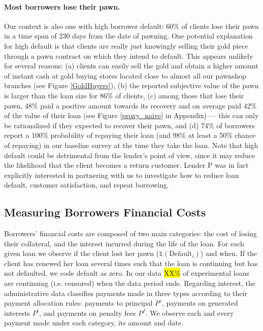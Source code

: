 \documentclass[oneside,11pt]{article}
\begin{document}
\paragraph{Most borrowers lose their pawn.} Our context is also one with high borrower default: 60\% of clients lose their pawn in a time span of 230 days from the date of pawning. One potential explanation for high default is that clients are really just knowingly selling their gold piece through a pawn contract on which they intend to default. This appears unlikely for several reasons: (a) clients can easily sell the gold and obtain a higher amount of instant cash at gold buying stores located close to almost all our pawnshop branches (see Figure \ref{GoldBuyers}), (b) the reported subjective value of the pawn is larger than the loan size for 86\% of clients, (c) among those that lose their pawn, 48\% paid a positive amount towards its recovery and on average paid 42\% of the value of their loan (see Figure \ref{proxy_naive} in Appendix) --- this can only be rationalized if they expected to recover their pawn, and (d) 74\% of borrowers report a 100\% probability of repaying their loan (and 98\% at least a 50\% chance of repaying) in our baseline survey at the time they take the loan.  Note that high default could be detrimental from the lender's point of view, since it may reduce the likelihood that the client becomes a return customer. Lender P was in fact explicitly interested in partnering with us to investigate how to reduce loan default, customer satisfaction, and repeat borrowing.

    
\subsection{Measuring Borrowers Financial Costs} \label{costs}
    
Borrowers' financial costs are composed of two main categories: the cost of losing their collateral, and the interest incurred during the life of the loan. For each given loan we observe if the client lost her pawn ($\mathds{1}(\text{Default}_i)$) and when. If the client has renewed her loan several times such that the loan is continuing but has not defaulted, we code default as zero. In our data \hl{XX\%} of experimental loans are continuing (i.e. censored) when the data period ends. Regarding interest, the administrative data classifies payments made in three types according to their payment allocation rules: payments to principal $P^c$, payments on generated interests $P^i$, and payments on penalty fees $P^f$. We observe each and every payment made under each category, its amount and date. 
\end{document}
